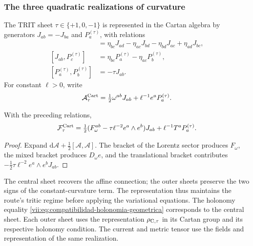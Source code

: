 \subsubsection{The three quadratic realizations of curvature}

The TRIT sheet \(\tau\in\{+1,0,-1\}\) is represented in
the Cartan algebra by generators \(J_{ab}=-J_{ba}\)
and \(P_a^{(\tau)}\), with relations
\begin{align*}
 [J_{ab},J_{cd}]&=
 \eta_{bc}J_{ad}-\eta_{ac}J_{bd}
 -\eta_{bd}J_{ac}+\eta_{ad}J_{bc},\\
 [J_{ab},P_c^{(\tau)}]&=
 \eta_{bc}P_a^{(\tau)}-\eta_{ac}P_b^{(\tau)},\\
 [P_a^{(\tau)},P_b^{(\tau)}]&=-\tau J_{ab}.
\end{align*}
For constant \(\ell>0\), write
\[
 \mathcal A_\tau^{\rm Cart}
 =\tfrac12\omega^{ab}J_{ab}+\ell^{-1}e^aP_a^{(\tau)}.
\]

\begin{proposition}
\label{vii:prop:curvatura-tritificada}
With the preceding relations,
\begin{equation}
 \mathcal F_\tau^{\rm Cart}
 =\tfrac12(F_\omega^{ab}-\tau\ell^{-2}e^a\wedge e^b)J_{ab}
     +\ell^{-1}T^aP_a^{(\tau)}.
 \label{vii:eq:curvatura-tritificada}
\end{equation}
\end{proposition}
\begin{proof}
Expand \(\mathrm d\mathcal A+\tfrac12[\mathcal A,\mathcal A]\).
The bracket of the Lorentz sector produces \(F_\omega\), the
mixed bracket produces \(D_\omega e\), and the translational bracket contributes
\(-\tfrac12\tau\ell^{-2}e^a\wedge e^bJ_{ab}\).
\end{proof}

The central sheet recovers the affine connection; the outer sheets
preserve the two signs of the constant-curvature term.
The representation thus maintains the route's tritic regime before
applying the variational equations. The holonomy equality
\eqref{vii:eq:compatibilidad-holonomia-geometrica} corresponds to the
central sheet. Each outer sheet uses the representation
\(\rho_{{\rm C},\tau}\) in its Cartan group and its respective
holonomy condition. The current and metric tensor use
the fields and representation of the same realization.
